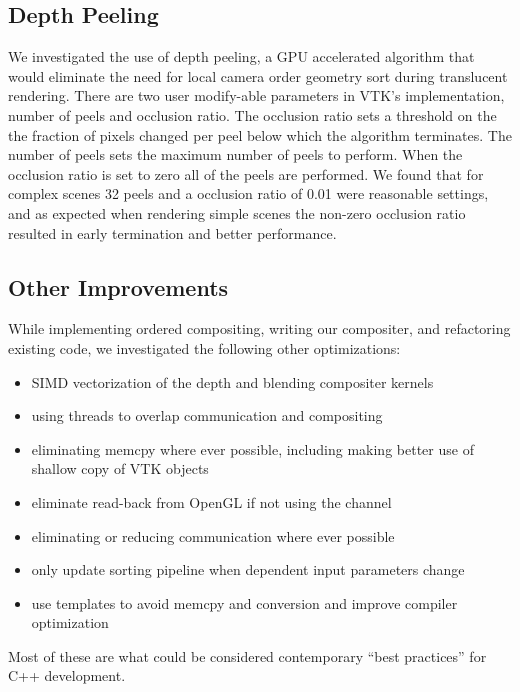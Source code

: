 \documentclass[a4paper,10pt]{report}
\begin{document}
\subsection*{Depth Peeling}
We investigated the use of depth peeling, a GPU accelerated algorithm that would eliminate the need for local camera order geometry sort during translucent rendering. There are two user modify-able parameters in VTK's implementation, number of peels and occlusion ratio. The occlusion ratio sets a threshold on the the fraction of pixels changed per peel below which the algorithm terminates. The number of peels sets the maximum number of peels to perform. When the occlusion ratio is set to zero all of the peels are performed. We found that for complex scenes 32 peels and a occlusion ratio of 0.01 were reasonable settings, and as expected when rendering simple scenes the non-zero occlusion ratio resulted in early termination and better performance.

\subsection*{Other Improvements}
While implementing ordered compositing, writing our compositer, and refactoring existing code, we investigated the following other optimizations:
\begin{itemize}
 \item SIMD vectorization of the depth and blending compositer kernels
 \item using threads to overlap communication and compositing
 \item eliminating memcpy where ever possible, including making better use of shallow copy of VTK objects
 \item eliminate read-back from OpenGL if not using the channel
 \item eliminating or reducing communication where ever possible
 \item only update sorting pipeline when dependent input parameters change
 \item use templates to avoid memcpy and conversion and improve compiler optimization
\end{itemize}
Most of these are what could be considered contemporary ``best practices'' for C++ development.
\end{document}
